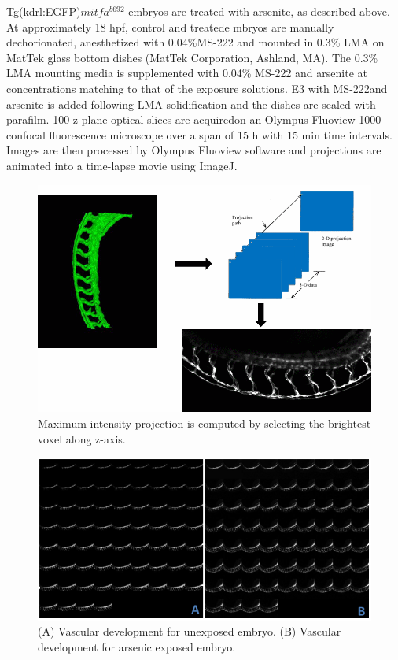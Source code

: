 Tg(kdrl:EGFP)$mitfa^{b692}$ embryos are treated with arsenite, as described above. At approximately 18 hpf, control and treatede mbryos are manually dechorionated, anesthetized with 0.04\%MS-222 and mounted in 0.3\% LMA on MatTek glass bottom dishes (MatTek Corporation, Ashland, MA). The 0.3\% LMA mounting media is supplemented with 0.04\% MS-222 and arsenite at concentrations matching to that of the exposure solutions. E3 with MS-222and arsenite is added following LMA solidification and the dishes are sealed with parafilm. 100 z-plane optical slices are acquiredon an Olympus Fluoview 1000 confocal fluorescence microscope over a span of 15 h with 15 min time intervals. Images are then processed by Olympus Fluoview software and projections are animated into a time-lapse movie using ImageJ.

\begin{figure}[htb] 
 \begin{center}
    \includegraphics[scale=0.5]{figure/projection.png}
  \end{center}
  \caption[Maximum intensity projection]{Maximum intensity projection is computed by selecting the brightest voxel along z-axis.}
 \label{mip}
\end{figure}

\begin{figure}[htb] 
 \begin{center}
    \includegraphics[scale=0.75]{figure/mon.png}
  \end{center}
  \caption[Zebrafish vasculature dataset]{(A) Vascular development for unexposed embryo. (B) Vascular development for arsenic exposed embryo.}
 \label{2dVascular}
\end{figure}


